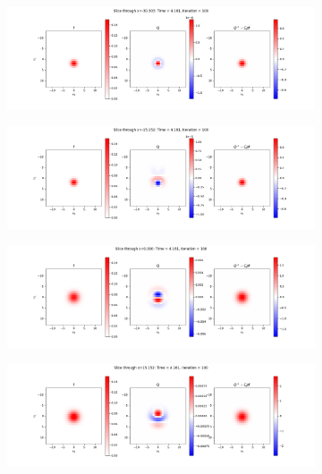 \documentclass{article}
\begin{document}
\begin{figure}[H]
  \begin{subfigure}[b]{\textwidth}
    \includegraphics[width=\textwidth]{imgs/ts_output2/slice0/mat100.png}
  \end{subfigure}
  \hfill
  \begin{subfigure}[b]{\textwidth}
    \includegraphics[width=\textwidth]{imgs/ts_output2/slice25/mat100.png}
  \end{subfigure}
  \hfill
  \begin{subfigure}[b]{\textwidth}
    \includegraphics[width=\textwidth]{imgs/ts_output2/slice50/mat100.png}
  \end{subfigure}
  \hfill
  \begin{subfigure}[b]{\textwidth}
    \includegraphics[width=\textwidth]{imgs/ts_output2/slice75/mat100.png}
  \end{subfigure}
\end{figure}
\end{document}
